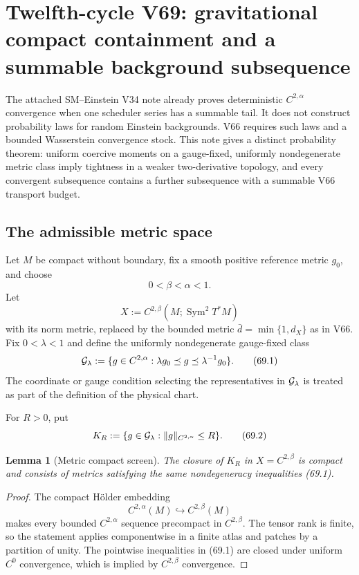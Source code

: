 \documentclass[11pt]{article}
\newtheorem{lemma}[theorem]{Lemma}
\theoremstyle{remark}
\begin{document}
\section{Twelfth-cycle V69: gravitational compact containment and a
summable background subsequence}
\label{sec:v12v69}

The attached SM--Einstein V34 note already proves deterministic
\(C^{2,\alpha}\) convergence when one scheduler series has a
summable tail.  It does not construct probability laws for random
Einstein backgrounds.  V66 requires such laws and a bounded
Wasserstein convergence stock.  This note gives a distinct
probability theorem: uniform coercive moments on a gauge-fixed,
uniformly nondegenerate metric class imply tightness in a weaker
two-derivative topology, and every convergent subsequence contains a
further subsequence with a summable V66 transport budget.

\subsection{The admissible metric space}

Let \(M\) be compact without boundary, fix a smooth positive
reference metric \(g_0\), and choose
\[
                         0<\beta<\alpha<1.
\]
Let
\[
 X:=C^{2,\beta}(M;\operatorname{Sym}^2T^*M)
\]
with its norm metric, replaced by the bounded metric
\(\bar d=\min\{1,d_X\}\) as in V66.  Fix
\(0<\lambda<1\) and define the uniformly nondegenerate gauge-fixed
class
\begin{equation}
 {\cal G}_\lambda
 :=
 \{g\in C^{2,\alpha}:
   \lambda g_0\preceq g\preceq\lambda^{-1}g_0\}.  \tag{69.1}
\end{equation}
The coordinate or gauge condition selecting the representatives in
\({\cal G}_\lambda\) is treated as part of the definition of the
physical chart.

For \(R>0\), put
\begin{equation}
 K_R:=
 \{g\in{\cal G}_\lambda:\|g\|_{C^{2,\alpha}}\leq R\}.          \tag{69.2}
\end{equation}

\begin{lemma}[Metric compact screen]
\label{lem:v12v69-compact-screen}
The closure of \(K_R\) in \(X=C^{2,\beta}\) is compact and consists
of metrics satisfying the same nondegeneracy inequalities (69.1).
\end{lemma}

\begin{proof}
The compact Hölder embedding
\[
 C^{2,\alpha}(M)\hookrightarrow C^{2,\beta}(M)
\]
makes every bounded \(C^{2,\alpha}\) sequence precompact in
\(C^{2,\beta}\).  The tensor rank is finite, so the statement applies
componentwise in a finite atlas and patches by a partition of unity.
The pointwise inequalities in (69.1) are closed under uniform
\(C^0\) convergence, which is implied by \(C^{2,\beta}\)
convergence.
\end{proof}
\end{document}
